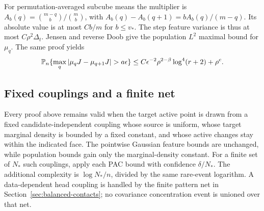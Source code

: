 For permutation-averaged subcube means the multiplier is
$A_b(q)=\binom{m-q}{b}/\binom mb$, with
$A_b(q)-A_b(q+1)=bA_b(q)/(m-q)$. Its absolute value is at most
$Cb/m$ for $b\le v_*$. The step feature variance is thus at most
$C\rho^2\Delta_t$. Jensen and reverse Doob give the population
$L^2$ maximal bound for $\mu_q$. The same proof yields
\begin{equation}\label{eq:middle-binomial-step-pac}
 \Pp_n\{\max_q|\mu_qJ-\mu_{q+1}J|>a\epsilon\}
       \le C\epsilon^{-2}\rho^{2-\beta}\log^4(r+2)+\rho^c.
\end{equation}

\subsection{Fixed couplings and a finite net}
Every proof above remains valid when the target active point is drawn
from a fixed candidate-independent coupling whose source is uniform,
whose target marginal density is bounded by a fixed constant, and whose
active changes stay within the indicated face. The pointwise Gaussian
feature bounds are unchanged, while population bounds gain only the
marginal-density constant. For a finite set of $N_*$ such couplings,
apply each PAC bound with confidence $\delta/N_*$. The additional
complexity is $\log N_*/n$, divided by the same rare-event logarithm.
A data-dependent head coupling is handled by the finite pattern net in
Section~\ref{sec:balanced-contacts}; no covariance concentration event is
unioned over that net.
